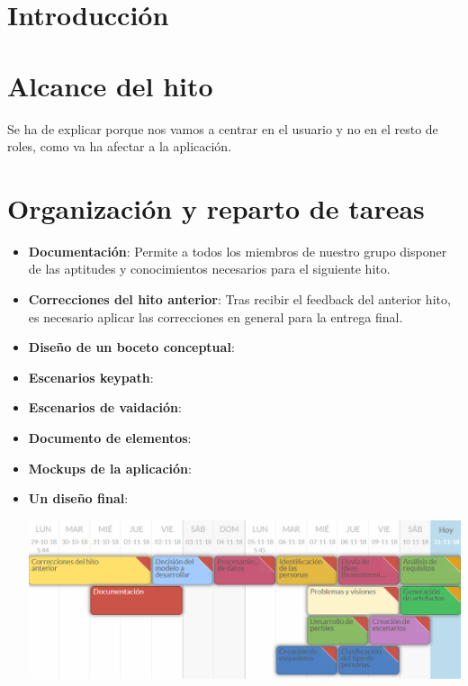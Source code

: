 \documentclass[12pt]{article}
\begin{document}
\section{Introducción}





\section{Alcance del hito}
Se ha de explicar porque nos vamos a centrar en el usuario y no en el resto de roles, como va ha afectar a la aplicación.


\section{Organización y reparto de tareas}
\begin{itemize}

\item \textbf{Documentación}: Permite a todos los miembros de nuestro grupo disponer de las aptitudes y conocimientos necesarios para el siguiente hito.

\item \textbf{Correcciones del hito anterior}: Tras recibir el feedback del anterior hito, es
necesario aplicar las correcciones en general para la entrega final.

\item \textbf{Diseño de un boceto conceptual}:

\item \textbf{Escenarios keypath}:

\item \textbf{Escenarios de vaidación}: 

\item \textbf{Documento de elementos}:

\item \textbf{Mockups de la aplicación}:

\item \textbf{Un diseño final}: 

\begin{center}
	\includegraphics[width=1\textwidth]{planificacionHito2.png}
\end{center}
\phantom{10}


\end{itemize}
\end{document}
